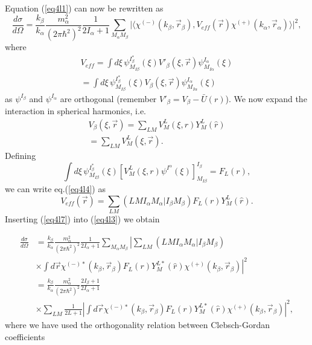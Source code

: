 \begin{subappendices}
Equation (\ref{eq4l1}) can now be rewritten as
\begin{equation}\label{eq4l3}
 \frac{d\sigma}{d\Omega}=\frac{k_\beta}{k_\alpha}\frac{m_\alpha^2}{(2 \pi \hbar^2)^2}\frac{1}{2 I_\alpha+1}\sum_{M_\alpha M_\beta}
\vert\langle
\chi^{(-)}(k_\beta,\vec{r}_\beta),V_{eff}(\vec{r}) \chi^{(+)}(k_\alpha,\vec{r}_\alpha)\rangle\vert^2,
\end{equation}
where
\begin{equation}\label{eq4l4}
\begin{split}
 V_{eff}=\int d\xi \,\psi_{M_{I\beta}}^{I_\beta^*}(\xi) V'_\beta(\xi,\vec{r}) \psi_{M_{I\alpha}}^{I_\alpha}(\xi)\\
= \int d\xi\, \psi_{M_{I\beta}}^{I_\beta^*}(\xi) V_\beta(\xi,\vec{r}) \psi_{M_{I\alpha}}^{I_\alpha}(\xi)
\end{split}
\end{equation}
 as $\psi^{I_\beta}$ and $\psi^{I_\alpha}$ are orthogonal (remember $V'_\beta=V_\beta-\bar{U}(r)$).
We now expand the interaction in spherical harmonics, i.e.
\begin{equation}\label{eq4l5}
\begin{split}
V_\beta(\xi,\vec{r}) =\sum_{LM} V_M^L(\xi,r) Y_M^L(\hat{r})\\
= \sum_{LM} V_M^L(\xi,\vec{r}).
\end{split}
\end{equation}
Defining
\begin{equation}\label{eq4l6}
 \int d\xi \,\psi_{M_{I\beta}}^{I_\beta^*}(\xi) [V_M^L(\xi,r) \psi^{I^\alpha}(\xi)]_{M_{I\beta}}^{I_\beta}
= F_L(r),
\end{equation}
we can write eq.(\ref{eq4l4}) as
\begin{equation}\label{eq4l7}
V_{eff}(\vec{r})= \sum_{LM} (LMI_\alpha M_\alpha \vert I_\beta M_\beta) F_L(r) Y_M^L(\hat{r}).
\end{equation}
Inserting (\ref{eq4l7}) into (\ref{eq4l3}) we obtain



\begin{equation}\label{eq4l8}
\begin{split}
\frac{d\sigma}{d\Omega}&=\frac{k_\beta}{k_\alpha}\frac{m_\alpha^2}{(2 \pi \hbar^2)^2}\frac{1}{2 I_\alpha+1}
\sum_{M_\alpha M_\beta}
\left\vert
\sum_{LM} (LMI_\alpha M_\alpha \vert I_\beta M_\beta) \right.\\
&\times\left.\int d\vec r \chi^{(-)*}(k_\beta,\vec{r}_\beta)
F_L(r) Y_M^{L*}(\hat{r})\chi^{(+)}(k_\beta,\vec{r}_\beta)\right\vert^2\\
&=\frac{k_\beta}{k_\alpha}\frac{m_\alpha^2}{(2 \pi \hbar^2)^2}\frac{2 I_\beta+1}{2 I_\alpha+1}\\
&\times\sum_{LM}\frac{1}{2 L+1} \left\vert \int d\vec r \chi^{(-)*}(k_\beta,\vec{r}_\beta)
F_L(r) Y_M^{L*}(\hat{r})\chi^{(+)}(k_\beta,\vec{r}_\beta)\right\vert^2,
\end{split}
\end{equation}
where we have used the orthogonality relation between Clebsch-Gordan coefficients


\end{subappendices}
